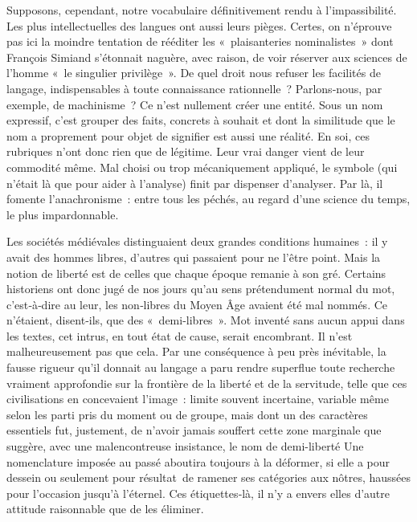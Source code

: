 \documentclass[french,twoside]{book} %
\begin{document}
\noindent Supposons, cependant, notre vocabulaire définitivement rendu à l’impas­sibilité. Les plus intellectuelles des langues ont aussi leurs pièges. Certes, on n’éprouve pas ici la moindre tentation de rééditer les « plaisanteries nominalistes » dont François Simiand s’étonnait naguère, avec raison, de voir réserver aux sciences de l’homme « le singulier privilège ». De quel  
\label{p88} droit nous refuser les facilités de langage, indispensables à toute con­naissance rationnelle ? Parlons‑nous, par exemple, de machinisme ? Ce n’est nullement créer une entité. Sous un nom expressif, c’est grouper des faits, concrets à souhait et dont la similitude que le nom a proprement pour objet de signifier est aussi une réalité. En soi, ces rubriques n’ont donc rien que de légitime. Leur vrai danger vient de leur commodité même. Mal choisi ou trop mécaniquement appliqué, le symbole (qui n’était là que pour aider à l’analyse) finit par dispenser d’analyser. Par là, il fomente l’anachronisme : entre tous les péchés, au regard d’une science du temps, le plus impardonnable.\par
Les sociétés médiévales distinguaient deux grandes conditions humaines : il y avait des hommes libres, d’autres qui passaient pour ne l’être point. Mais la notion de liberté est de celles que chaque époque remanie à son gré. Certains historiens ont donc jugé de nos jours qu’au sens prétendument normal du mot, c’est‑à‑dire au leur, les non‑libres du Moyen Âge avaient été mal nommés. Ce n’étaient, disent‑ils, que des « demi-libres ». Mot inventé sans aucun appui dans les textes, cet intrus, en tout état de cause, serait encombrant. Il n’est malheureusement pas que cela. Par une conséquence à peu près inévitable, la fausse rigueur qu’il donnait au langage a paru rendre superflue toute recherche vraiment approfondie sur la frontière de la liberté et de la servitude, telle que ces civilisations en concevaient l’image : limite souvent incertaine, variable même selon les parti pris du moment ou de groupe, mais dont un des caractères essentiels fut, justement, de n’avoir jamais souffert cette zone marginale que suggère, avec une malencontreuse insistance, le nom de demi-liberté Une nomenclature imposée au passé aboutira toujours à la défor­mer, si elle a pour dessein ou seulement pour résultat de ramener ses ca­tégories aux nôtres, haussées pour l’occasion jusqu’à l’éternel. Ces éti­quettes‑là, il n’y a envers elles d’autre attitude raisonnable que de les éliminer.\par
\end{document}
